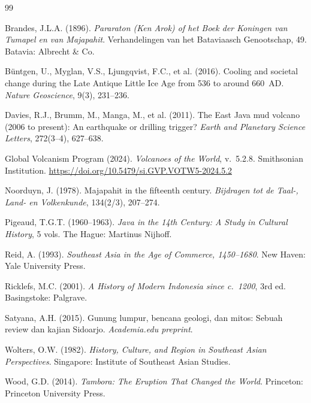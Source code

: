 \documentclass[12pt,a4paper]{article}
\begin{document}
\begin{thebibliography}{99}

Brandes, J.L.A. (1896).
\textit{Pararaton (Ken Arok) of het Boek der Koningen van Tumapel en van Majapahit}.
Verhandelingen van het Bataviaasch Genootschap, 49.
Batavia: Albrecht \& Co.

B{\"u}ntgen, U., Myglan, V.S., Ljungqvist, F.C., et al. (2016).
Cooling and societal change during the Late Antique Little Ice Age from 536 to around 660~AD.
\textit{Nature Geoscience}, 9(3), 231--236.

Davies, R.J., Brumm, M., Manga, M., et al. (2011).
The East Java mud volcano (2006 to present): An earthquake or drilling trigger?
\textit{Earth and Planetary Science Letters}, 272(3--4), 627--638.

Global Volcanism Program (2024).
\textit{Volcanoes of the World}, v.~5.2.8.
Smithsonian Institution.
\url{https://doi.org/10.5479/si.GVP.VOTW5-2024.5.2}

Noorduyn, J. (1978).
Majapahit in the fifteenth century.
\textit{Bijdragen tot de Taal-, Land- en Volkenkunde}, 134(2/3), 207--274.

Pigeaud, T.G.T. (1960--1963).
\textit{Java in the 14th Century: A Study in Cultural History}, 5 vols.
The Hague: Martinus Nijhoff.

Reid, A. (1993).
\textit{Southeast Asia in the Age of Commerce, 1450--1680}.
New Haven: Yale University Press.

Ricklefs, M.C. (2001).
\textit{A History of Modern Indonesia since c.~1200}, 3rd ed.
Basingstoke: Palgrave.

Satyana, A.H. (2015).
Gunung lumpur, bencana geologi, dan mitos: Sebuah review dan kajian Sidoarjo.
\textit{Academia.edu preprint}.

Wolters, O.W. (1982).
\textit{History, Culture, and Region in Southeast Asian Perspectives}.
Singapore: Institute of Southeast Asian Studies.

Wood, G.D. (2014).
\textit{Tambora: The Eruption That Changed the World}.
Princeton: Princeton University Press.

\end{thebibliography}
\end{document}
